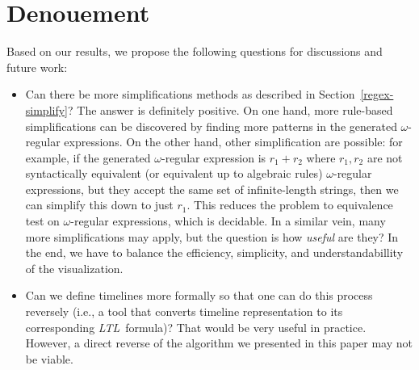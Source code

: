 \documentclass[conference]{IEEEtran}
\theoremstyle{definition}
\theoremstyle{remark}
\newcommand{\ltl}{\textit{LTL}}
\begin{document}
\section{Denouement}
Based on our results, we propose the following questions for discussions and future work:
\begin{itemize}
    \item Can there be more simplifications methods as described in Section~\ref{regex-simplify}? The answer is definitely positive. On one hand, more rule-based simplifications can be discovered by finding more patterns in the generated $\omega$-regular expressions. On the other hand, other simplification are possible: for example, if the generated $\omega$-regular expression is $r_1 + r_2$ where $r_1, r_2$ are not syntactically equivalent (or equivalent up to algebraic rules) $\omega$-regular expressions, but they accept the same set of infinite-length strings, then we can simplify this down to just $r_1$. This reduces the problem to equivalence test on $\omega$-regular expressions, which is decidable. In a similar vein, many more simplifications may apply, but the question is how \emph{useful} are they? In the end, we have to balance the efficiency, simplicity, and understandabillity of the visualization.
    \item Can we define timelines more formally so that one can do this process reversely (i.e., a tool that converts timeline representation to its corresponding \ltl\ formula)? That would be very useful in practice. However, a direct reverse of the algorithm we presented in this paper may not be viable.
\end{itemize}
\end{document}
